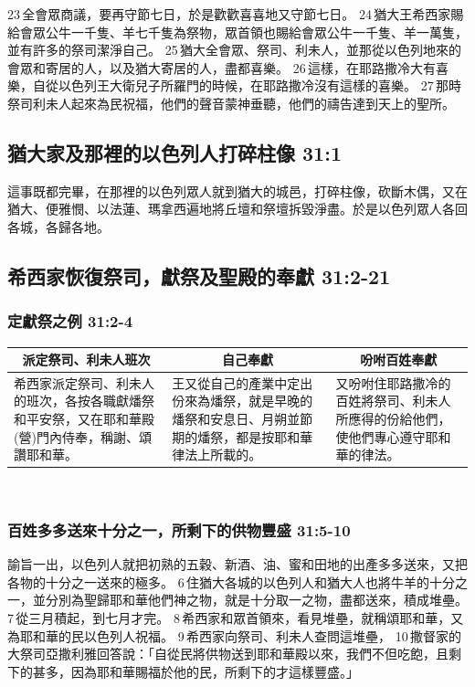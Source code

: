 23 全會眾商議，要再守節七日，於是歡歡喜喜地又守節七日。 24 猶大王希西家賜給會眾公牛一千隻、羊七千隻為祭物，眾首領也賜給會眾公牛一千隻、羊一萬隻，並有許多的祭司潔淨自己。 25 猶大全會眾、祭司、利未人，並那從以色列地來的會眾和寄居的人，以及猶大寄居的人，盡都喜樂。 26 這樣，在耶路撒冷大有喜樂，自從以色列王大衛兒子所羅門的時候，在耶路撒冷沒有這樣的喜樂。 27 那時祭司利未人起來為民祝福，他們的聲音蒙神垂聽，他們的禱告達到天上的聖所。

\subsection{猶大家及那裡的以色列人打碎柱像 31:1}
這事既都完畢，在那裡的以色列眾人就到猶大的城邑，打碎柱像，砍斷木偶，又在猶大、便雅憫、以法蓮、瑪拿西遍地將丘壇和祭壇拆毀淨盡。於是以色列眾人各回各城，各歸各地。


\subsection{希西家恢復祭司，獻祭及聖殿的奉獻 31:2-21}
\subsubsection{定獻祭之例 31:2-4}
\begin{table}[H]
\centering
\begin{tabular}{p{5.75cm}|p{5.95cm}|p{}}\hline\hline
\multicolumn{1}{c|}{派定祭司、利未人班次}&\multicolumn{1}{c|}{自己奉獻}&\multicolumn{1}{c}{吩咐百姓奉獻}\\\hline
希西家派定祭司、利未人的班次，各按各職獻燔祭和平安祭，又在耶和華殿(營)門內侍奉，稱謝、頌讚耶和華。
&王又從自己的產業中定出份來為燔祭，就是早晚的燔祭和安息日、月朔並節期的燔祭，都是按耶和華律法上所載的。
&又吩咐住耶路撒冷的百姓將祭司、利未人所應得的份給他們，使他們專心遵守耶和華的律法。\\\hline 
\end{tabular}
\end{table} 


\subsubsection{百姓多多送來十分之一，所剩下的供物豐盛 31:5-10}
諭旨一出，以色列人就把初熟的五穀、新酒、油、蜜和田地的出產多多送來，又把各物的十分之一送來的極多。 6 住猶大各城的以色列人和猶大人也將牛羊的十分之一，並分別為聖歸耶和華他們神之物，就是十分取一之物，盡都送來，積成堆壘。 7 從三月積起，到七月才完。 8 希西家和眾首領來，看見堆壘，就稱頌耶和華，又為耶和華的民以色列人祝福。 9 希西家向祭司、利未人查問這堆壘， 10 撒督家的大祭司亞撒利雅回答說：「自從民將供物送到耶和華殿以來，我們不但吃飽，且剩下的甚多，因為耶和華賜福於他的民，所剩下的才這樣豐盛。」

